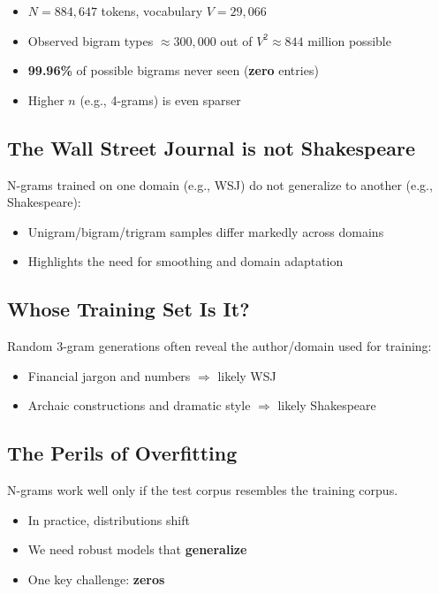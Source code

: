 \documentclass[11pt,a4paper]{article}
\theoremstyle{definition}
\theoremstyle{plain}
\theoremstyle{remark}
\begin{document}
\begin{itemize}
    \item $N=884{,}647$ tokens, vocabulary $V=29{,}066$
    \item Observed bigram types $\approx 300{,}000$ out of $V^2 \approx 844$ million possible
    \item \textbf{99.96\%} of possible bigrams never seen (\textbf{zero} entries)
    \item Higher $n$ (e.g., 4-grams) is even sparser
\end{itemize}

\subsection{The Wall Street Journal is not Shakespeare}

N-grams trained on one domain (e.g., WSJ) do not generalize to another (e.g., Shakespeare):
\begin{itemize}
    \item Unigram/bigram/trigram samples differ markedly across domains
    \item Highlights the need for smoothing and domain adaptation
\end{itemize}

\subsection{Whose Training Set Is It?}

Random 3-gram generations often reveal the author/domain used for training:
\begin{itemize}
    \item Financial jargon and numbers $\Rightarrow$ likely WSJ
    \item Archaic constructions and dramatic style $\Rightarrow$ likely Shakespeare
\end{itemize}

\subsection{The Perils of Overfitting}

N-grams work well only if the test corpus resembles the training corpus.
\begin{itemize}
    \item In practice, distributions shift
    \item We need robust models that \textbf{generalize}
    \item One key challenge: \textbf{zeros}
\end{itemize}
\end{document}
